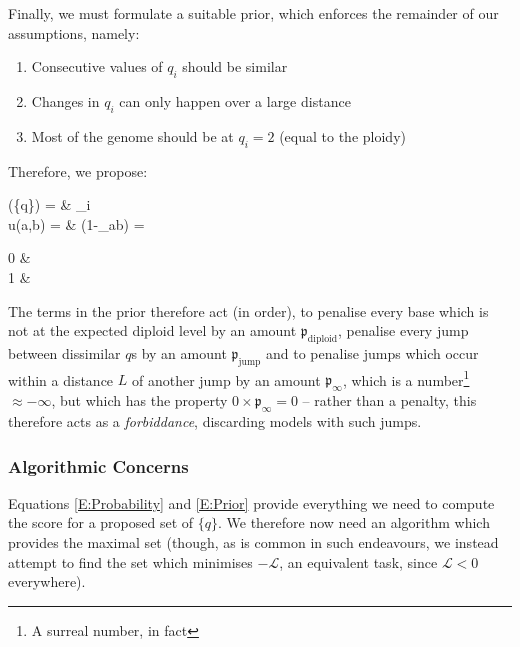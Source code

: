 \documentclass[fleqn,usenatbib]{mnras}
\begin{document}
				Finally, we must formulate a suitable prior, which enforces the remainder of our assumptions, namely:
				\begin{enumerate}
					\item Consecutive values of $q_i$ should be similar
					\item Changes in $q_i$ can only happen over a large distance
					\item Most of the genome should be at $q_i = 2$ (equal to the ploidy)
				\end{enumerate}
				Therefore, we propose:
				\begin{spalign}
					(\{q\})   = & \sum_i \Bigg[  \mathfrak{p}_\text{ploidy} u(q_i,2)  
					\\
					 + & u(q_i,q_{i-1})\left( \mathfrak{p}_\text{jump} +  \mathfrak{p}_\infty \sum_{j = i-L}^{i-1} u(q_j,q_{i-1})  \right)\Bigg]
					 \\
					 u(a,b)  = & (1-\delta_{ab}) = \begin{cases}
						0 & 
						\\
						1 & 
					 \end{cases}\label{E:Prior}
				\end{spalign}
				The terms in the prior therefore act (in order), to penalise every base which is not at the expected diploid level by an amount $\mathfrak{p}_\text{diploid}$, penalise every jump between dissimilar $q$s by an amount $\mathfrak{p}_\text{jump}$ and to penalise jumps which occur within a distance $L$ of another jump by an amount $\mathfrak{p}_\infty$, which is a number\footnote{A surreal number, in fact} $\approx -\infty$, but which has the property $0 \times \mathfrak{p}_\infty = 0$ -- rather than a penalty, this therefore acts as a \textit{forbiddance}, discarding models with such jumps.


			\subsubsection{Algorithmic Concerns}

				Equations \eqref{E:Probability} and \eqref{E:Prior} provide everything we need to compute the score  for a proposed set of $\{q\}$. We therefore now need an algorithm which provides the maximal set (though, as is common in such endeavours, we instead attempt to find the set which minimises $-\mathcal{L}$, an equivalent task, since $\mathcal{L} < 0$ everywhere).

\end{document}
